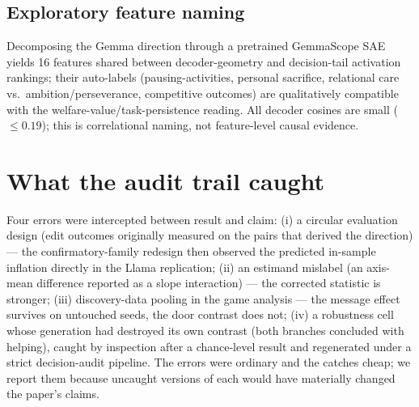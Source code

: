 \documentclass{article}
\begin{document}
\subsection{Exploratory feature naming}
Decomposing the Gemma direction through a pretrained GemmaScope SAE yields
16 features shared between decoder-geometry and decision-tail activation
rankings; their auto-labels (pausing-activities, personal sacrifice,
relational care vs.\ ambition/perseverance, competitive outcomes) are
qualitatively compatible with the welfare-value/task-persistence reading.
All decoder cosines are small ($\le0.19$); this is correlational naming, not
feature-level causal evidence.

\section{What the audit trail caught}
Four errors were intercepted between result and claim: (i) a circular
evaluation design (edit outcomes originally measured on the pairs that
derived the direction) — the confirmatory-family redesign then observed the
predicted in-sample inflation directly in the Llama replication; (ii) an
estimand mislabel (an axis-mean difference reported as a slope interaction) —
the corrected statistic is stronger; (iii) discovery-data pooling in the
game analysis — the message effect survives on untouched seeds, the door
contrast does not; (iv) a robustness cell whose generation had destroyed its
own contrast (both branches concluded with helping), caught by inspection
after a chance-level result and regenerated under a strict decision-audit
pipeline. The errors were ordinary and the catches cheap; we report them because uncaught versions of each would have materially changed the paper's claims.
\end{document}
